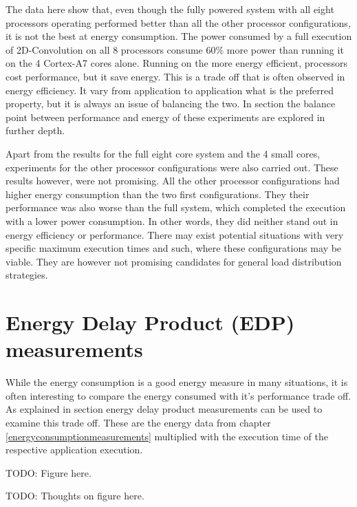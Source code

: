 The data here show that, even though the fully powered system with all eight processors operating performed better than all the other processor configurations, it is not the best at energy consumption.
The power consumed by a full execution of 2D-Convolution on all 8 processors consume 60\% more power than running it on the 4 Cortex-A7 cores alone.
Running on the more energy efficient, processors cost performance, but it save energy.
This is a trade off that is often observed in energy efficiency.
It vary from application to application what is the preferred property, but it is always an issue of balancing the two.
In section  the balance point between performance and energy of these experiments are explored in further depth.

Apart from the results for the full eight core system and the 4 small cores, experiments for the other processor configurations were also carried out.
These results however, were not promising.
All the other processor configurations had higher energy consumption than the two first configurations.
They their performance was also worse than the full system, which completed the execution with a lower power consumption.
In other words, they did neither stand out in energy efficiency or performance.
There may exist potential situations with very specific maximum execution times and such, where these configurations may be viable.
They are however not promising candidates for general load distribution strategies.

\section{Energy Delay Product (EDP) measurements} \label{EDP}
While the energy consumption is a good energy measure in many situations, it is often interesting to compare the energy consumed with it's performance trade off.
As explained in section  energy delay product measurements can be used to examine this trade off.
These are the energy data from chapter \ref{energyconsumptionmeasurements} multiplied with the execution time of the respective application execution.

TODO: Figure here.

TODO: Thoughts on figure here.

